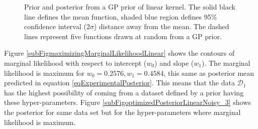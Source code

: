 \begin{figure}[!h]
  \centering
    \quad
{}\quad

       \caption{Prior and posterior from a GP prior of linear kernel. The solid black line defines the mean function, shaded blue region defines 95\% confidence interval (2$\sigma$) distance away from the mean. The dashed lines represent five functions drawn at random from a GP prior.}
       \label{figPriorAndPosteriorLinearKernel}
\end{figure}

\begin{mdframed}[hidealllines=true,backgroundcolor=lightgray!20]
Figure \ref{subFigmaximizingMarginalLikelihoodLinear} shows the contours of marginal likelihood with respect to intercept ($w_{0}$) and slope ($w_{1}$). The marginal likelihood is maximum for $w_{0} = 0.2576, w_{1} = 0.4584$, this same as posterior mean predicted in equation \ref{eqExperimentalPosterior}. This means that the data $\mathcal{D}_{1}$ has the highest possibility of coming from a dataset defined by a prior having these hyper-parameters. Figure \ref{subFigoptimizedPosteriorLinearNoisy_3} shows the posterior for same data set but for the hyper-parameters where marginal likelihood is maximum.
\end{mdframed}

